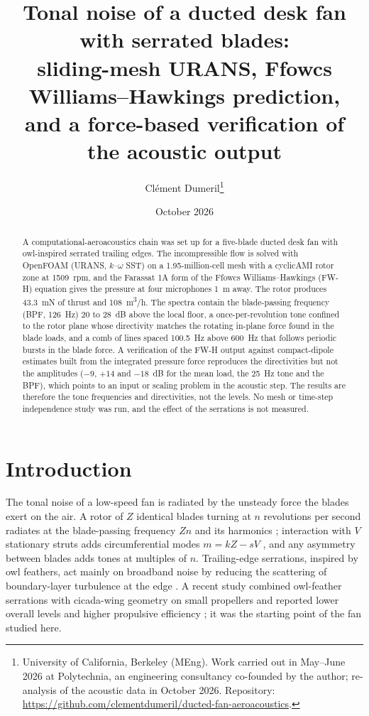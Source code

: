 \documentclass[11pt]{article}
\title{Tonal noise of a ducted desk fan with serrated blades:\\
sliding-mesh URANS, Ffowcs Williams--Hawkings prediction,\\
and a force-based verification of the acoustic output}
\author{Cl\'ement Dumeril\thanks{University of California, Berkeley (MEng). Work carried out in May--June 2026 at
Polytechnia, an engineering consultancy co-founded by the author; re-analysis of the acoustic data in October 2026.
Repository: \url{https://github.com/clementdumeril/ducted-fan-aeroacoustics}.}}
\date{October 2026}
\begin{document}
\maketitle

\begin{abstract}
A computational-aeroacoustics chain was set up for a five-blade ducted desk fan with owl-inspired serrated
trailing edges. The incompressible flow is solved with OpenFOAM (URANS, $k$--$\omega$ SST) on a
\num{1.95}-million-cell mesh with a cyclicAMI rotor zone at \SI{1509}{rpm}, and the Farassat 1A form of the
Ffowcs Williams--Hawkings (FW-H) equation gives the pressure at four microphones \SI{1}{m} away. The rotor
produces \SI{43.3}{mN} of thrust and \SI{108}{m^3/h}. The spectra contain the blade-passing frequency (BPF,
\SI{126}{Hz}) 20 to \SI{28}{dB} above the local floor, a once-per-revolution tone confined to the rotor plane whose
directivity matches the rotating in-plane force found in the blade loads, and a comb of lines spaced
\SI{100.5}{Hz} above \SI{600}{Hz} that follows periodic bursts in the blade force. A verification of the FW-H output
against compact-dipole estimates built from the integrated pressure force reproduces the directivities but not the
amplitudes ($-9$, $+14$ and $-18$~dB for the mean load, the \SI{25}{Hz} tone and the BPF), which points to an input
or scaling problem in the acoustic step. The results are therefore the tone frequencies and directivities, not the
levels. No mesh or time-step independence study was run, and the effect of the serrations is not measured.
\end{abstract}

\section{Introduction}

The tonal noise of a low-speed fan is radiated by the unsteady force the blades exert on the air. A rotor of $Z$
identical blades turning at $n$ revolutions per second radiates at the blade-passing frequency $Zn$ and its
harmonics \citep{lowson1965}; interaction with $V$ stationary struts adds circumferential modes $m=kZ-sV$
\citep{tyler1962}, and any asymmetry between blades adds tones at multiples of $n$. Trailing-edge serrations,
inspired by owl feathers, act mainly on broadband noise by reducing the scattering of boundary-layer turbulence at
the edge \citep{howe1991,lyu2016}. A recent study combined owl-feather serrations with cicada-wing geometry on small
propellers and reported lower overall levels and higher propulsive efficiency \citep{wei2024}; it was the starting
point of the fan studied here.
\end{document}

